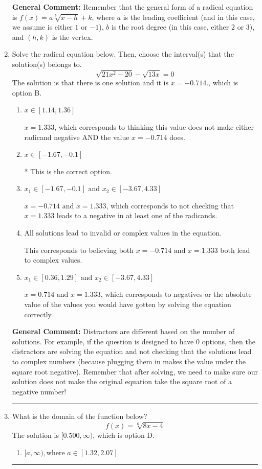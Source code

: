 \documentclass{extbook}[14pt]
\newcommand{\litem}[1]{\item #1

\rule{\textwidth}{0.4pt}}
\begin{document}
\begin{enumerate}
{\textbf{General Comment:} Remember that the general form of a radical equation is $ f(x) = a \sqrt[b]{x - h} + k$, where $a$ is the leading coefficient (and in this case, we assume is either $1$ or $-1$), $b$ is the root degree (in this case, either $2$ or $3$), and $(h, k)$ is the vertex.
}
\litem{
Solve the radical equation below. Then, choose the interval(s) that the solution(s) belongs to.
\[ \sqrt{21 x^2 - 20} - \sqrt{13 x} = 0 \]The solution is \( \text{that there is one solution and it is } x = -0.714. \), which is option B.\begin{enumerate}[label=\Alph*.]
\item \( x \in [1.14,1.36] \)

$x = 1.333$, which corresponds to thinking this value does not make either radicand negative AND the value $x = -0.714$ does.
\item \( x \in [-1.67,-0.1] \)

* This is the correct option.
\item \( x_1 \in [-1.67, -0.1] \text{ and } x_2 \in [-3.67,4.33] \)

$x = -0.714 \text{ and } x = 1.333$, which corresponds to not checking that $x = 1.333$ leads to a negative in at least one of the radicands.
\item \( \text{All solutions lead to invalid or complex values in the equation.} \)

This corresponds to believing both $x = -0.714 \text{ and } x = 1.333$ both lead to complex values.
\item \( x_1 \in [0.36, 1.29] \text{ and } x_2 \in [-3.67,4.33] \)

$x = 0.714 \text{ and } x = 1.333$, which corresponds to negatives or the absolute value of the values you would have gotten by solving the equation correctly.
\end{enumerate}

\textbf{General Comment:} Distractors are different based on the number of solutions. For example, if the question is designed to have 0 options, then the distractors are solving the equation and not checking that the solutions lead to complex numbers (because plugging them in makes the value under the square root negative). Remember that after solving, we need to make sure our solution does not make the original equation take the square root of a negative number!
}
\litem{
What is the domain of the function below?
\[ f(x) = \sqrt[6]{8 x - 4} \]The solution is \( [0.500, \infty) \), which is option D.\begin{enumerate}[label=\Alph*.]
\item \( [a, \infty), \text{where } a \in [1.32, 2.07] \)


\end{enumerate}}
\end{enumerate}
\end{document}
